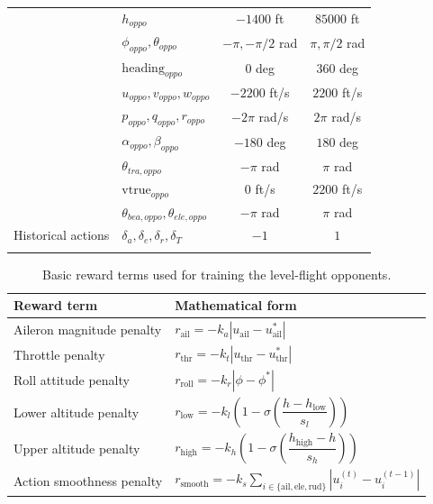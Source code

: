 \documentclass[pdflatex,sn-mathphys-num]{sn-jnl}%
\theoremstyle{thmstyleone}%
\theoremstyle{thmstyletwo}%
\theoremstyle{thmstylethree}%
\begin{document}
\begin{appendices}
\begin{table}[h]
\begin{tabular*}{\textwidth}{@{\extracolsep\fill}p{}p{}cc}
& $h_{oppo}$ & $-1400$ ft & $85000$ ft \\
& $\phi_{oppo},\theta_{oppo}$ & $-\pi,-\pi/2$ rad & $\pi,\pi/2$ rad \\
& $\mathrm{heading}_{oppo}$ & $0$ deg & $360$ deg \\
& $u_{oppo},v_{oppo},w_{oppo}$ & $-2200$ ft/s & $2200$ ft/s \\
& $p_{oppo},q_{oppo},r_{oppo}$ & $-2\pi$ rad/s & $2\pi$ rad/s \\
& $\alpha_{oppo},\beta_{oppo}$ & $-180$ deg & $180$ deg \\
& $\theta_{tra,oppo}$ & $-\pi$ rad & $\pi$ rad \\
& $\mathrm{vtrue}_{oppo}$ & $0$ ft/s & $2200$ ft/s \\
& $\theta_{bea,oppo},\theta_{ele,oppo}$ & $-\pi$ rad & $\pi$ rad \\
\midrule
Historical actions
& $\delta_a,\delta_e,\delta_r,\delta_T$ & $-1$ & $1$ \\
\botrule
\end{tabular*}
\end{table}


\begin{table}[h]
\caption{Basic reward terms used for training the level-flight opponents.}\label{tab:baseline_opponent_rewards}%
\begin{tabular*}{\textwidth}{@{\extracolsep\fill}p{}p{}}
\toprule
Reward term & Mathematical form \\
\midrule
Aileron magnitude penalty
& $r_{\mathrm{ail}}=-k_a |u_{\mathrm{ail}}-u_{\mathrm{ail}}^\ast|$ \\[4pt]

Throttle penalty
& $r_{\mathrm{thr}}=-k_t |u_{\mathrm{thr}}-u_{\mathrm{thr}}^\ast|$ \\[4pt]

Roll attitude penalty
& $r_{\mathrm{roll}}=-k_r |\phi-\phi^\ast|$ \\[4pt]

Lower altitude penalty
& $r_{\mathrm{low}}=-k_l\left(1-\sigma\left(\dfrac{h-h_{\mathrm{low}}}{s_l}\right)\right)$ \\[4pt]

Upper altitude penalty
& $r_{\mathrm{high}}=-k_h\left(1-\sigma\left(\dfrac{h_{\mathrm{high}}-h}{s_h}\right)\right)$ \\[4pt]

Action smoothness penalty
& $r_{\mathrm{smooth}}=-k_s \sum_{i\in\{\mathrm{ail},\mathrm{ele},\mathrm{rud}\}}
|u_i^{(t)}-u_i^{(t-1)}|$ \\[4pt]


\end{tabular*}
\end{table}
\end{appendices}
\end{document}
